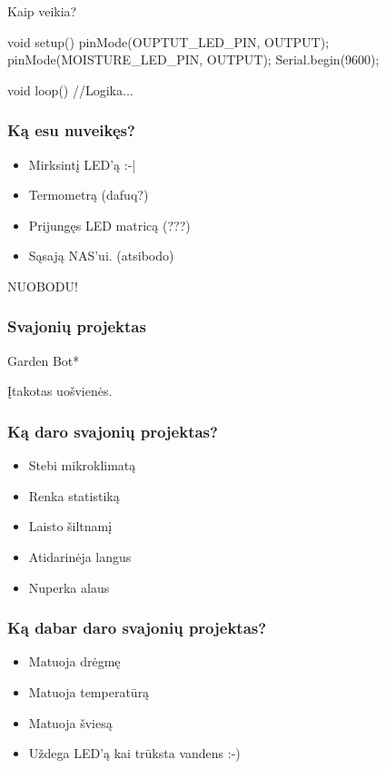 \documentclass[12pt,a4paper]{beamer}
\begin{document}
\begin{frame}[fragile]{Kaip veikia?}
\begin{ccode}
    void setup() {                
        pinMode(OUPTUT_LED_PIN, OUTPUT);
        pinMode(MOISTURE_LED_PIN, OUTPUT);
        Serial.begin(9600);
    }

    void loop() {
        //Logika...
    }
\end{ccode}
\end{frame}

\begin{frame}
    \frametitle{Ką esu nuveikęs?}

    \pause
    \begin{itemize}
        \item Mirksintį LED'ą :-|
        \pause
        \item Termometrą (dafuq?)
        \pause
        \item Prijungęs LED matricą (???)
        \pause
        \item Sąsają NAS'ui. (atsibodo)
    \end{itemize}
    \pause
    \begin{center}
        NUOBODU!
    \end{center}
\end{frame}

\begin{frame}
    \frametitle{Svajonių projektas}

    \begin{center}
        {\Huge Garden Bot*}
    \end{center}

    \vskip1cm
    {\small *Įtakotas uošvienės.}
    
\end{frame}

\begin{frame}
    \frametitle{Ką daro svajonių projektas?}

    \begin{itemize}
        \item Stebi mikroklimatą
        \item Renka statistiką
        \item Laisto šiltnamį
        \item Atidarinėja langus
        \item Nuperka alaus
    \end{itemize}
\end{frame}

\begin{frame}
    \frametitle{Ką dabar daro svajonių projektas?}

    \begin{itemize}
        \item Matuoja drėgmę
        \item Matuoja temperatūrą
        \item Matuoja šviesą
        \item Uždega LED'ą kai trūksta vandens :-)
    \end{itemize}
    
\end{frame}
\end{document}
